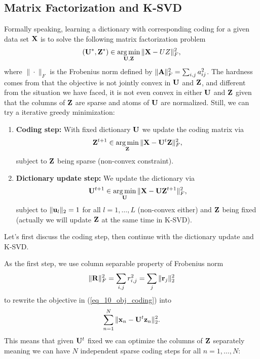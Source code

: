 \documentclass[../book-template.tex]{subfiles}
\begin{document}
\subsection{Matrix Factorization and K-SVD}
Formally speaking, learning a dictionary with corresponding coding for a given data set ${\bf X}$ is to solve the following matrix factorization problem
\begin{equation*}
	({\bf U^*,Z^*})\in \mathop{\arg\min}_{{\bf U,Z}}\|{\bf X}-UZ\|^2_F,
\end{equation*}
where $\|\cdot\|_F$ is the Frobenius norm defined by $\|{\bf A}\|_F^2=\sum_{i,j}a_{ij}^2$. The hardness comes from that the objective is not jointly convex in ${\bf U}$ and ${\bf Z}$, and different from the situation we have faced, it is not even convex in either ${\bf U}$ and ${\bf Z}$ given that the columns of ${\bf Z}$ are sparse and atoms of ${\bf U}$ are normalized. Still, we can try a iterative greedy minimization:
\begin{enumerate}
	\item \textbf{Coding step:} With fixed dictionary ${\bf U}$ we update the coding matrix via
	\begin{equation}\label{eq_10_obj_coding}
		{\bf Z}^{t+1}\in \mathop{\arg\min}_{\bf Z} \|{\bf X}-{\bf U}^t{\bf Z}\|_F^2,
	\end{equation}
	subject to ${\bf Z}$ being sparse (non-convex constraint).
	\item \textbf{Dictionary update step:} We update the dictionary via
	\begin{equation}\label{eq_10_obj_dic}
		{\bf U}^{t+1}\in \mathop{\arg\min}_{\bf U} \|{\bf X}-{\bf U}{\bf Z}^{t+1}\|_F^2,
	\end{equation}
	subject to $\|{\bf u}_l\|_2=1$ for all $l=1,\dots,L$ (non-convex either) and ${\bf Z}$ being fixed (actually we will update ${\bf Z}$ at the same time in K-SVD).
\end{enumerate}
Let's first discuss the coding step, then continue with the dictionary update and K-SVD.
\par As the first step, we use column separable property of Frobenius norm
\begin{equation*}
	\|{\bf R}\|^2_F = \sum_{i,j}r_{i,j}^2 = \sum_j \|{\bf r}_j\|_2^2
\end{equation*}
to rewrite the objective in (\ref{eq_10_obj_coding}) into
\begin{equation*}
	\sum_{n=1}^N\|{\bf x}_n-{\bf U}^t {\bf z}_n\|_2^2.
\end{equation*}
This means that given ${\bf U}^t$ fixed  we can optimize the columns of ${\bf Z}$ separately meaning we can have $N$ independent sparse coding steps for all $n=1,\dots,N$:
\end{document}
